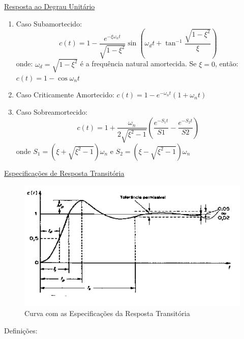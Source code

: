 \hspace{4ex} \underline{Resposta ao Degrau Unitário}

\begin{enumerate}
    \item Caso Subamortecido: 
        \[c(t)=1-\frac{e^{-\xi\omega_n t}}{\sqrt{1-\xi^2}}\sin(\omega_d t+\tan^{-1}\frac{\sqrt{1-\xi^2}}{\xi})\]
onde: \(\omega_d=\sqrt{1-\xi^2}\) é a frequência natural amortecida.
\newline
Se \(\xi=0\), então: \(c(t)=1-\cos\omega_n t\)

    \item Caso Criticamente Amortecido: \(c(t)=1-e^{-\omega_n t}(1+\omega_n t)\)

    \item Caso Sobreamortecido: 
    \[c(t)=1+\frac{\omega_n}{2\sqrt{\xi^2 -1}}(\frac{e^{-S_1 t}}{S1}-\frac{e^{-S_2 t}}{S2})\]
onde \(S_1=(\xi+\sqrt{\xi^2 -1})\omega_n\) e \(S_2=(\xi-\sqrt{\xi^2 -1})\omega_n\)
\newline
\end{enumerate}

\hspace{4ex} \underline{Especificações de Resposta Transitória}

\begin{figure}[h]
    \centering
    \includegraphics[width=15cm]{images/roteiro b/img ref teorico/curva.PNG}
    \caption{Curva com as Especificações da Resposta Transitória}
    \label{fig:curva}
\end{figure}

\hspace{4ex}Definições:

